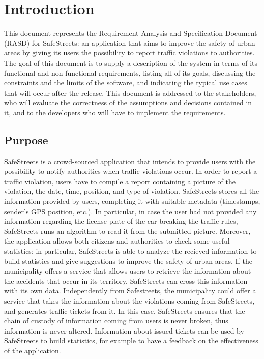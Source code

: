 \documentclass{report}
\begin{document}

\tableofcontents
\chapter{Introduction}
This document represents the Requirement Analysis and Specification Document (RASD) for SafeStreets: an application that aims to improve the safety of urban areas by giving its users the possibility to report traffic violations to authorities. The goal of this document is to supply a description of the system in terms of its functional and non-functional requirements, listing all of its goals, discussing the constraints and the limits of the software, and indicating the typical use cases that will occur after the release. This document is addressed to the stakeholders, who will evaluate the correctness of the assumptions and decisions contained in it, and to the developers who will have to implement the requirements.
\section{Purpose}
SafeStreets is a crowd-sourced application that intends to provide users with the possibility to notify authorities when traffic violations occur. In order to report a traffic violation, users have to compile a report containing a picture of the violation, the date, time, position, and type of violation. SafeStreets stores all the information provided by users, completing it with suitable metadata (timestamps, sender's GPS position, etc.). In particular, in case the user had not provided any information regarding the license plate of the car breaking the traffic rules, SafeStreets runs an algorithm to read it from the submitted picture. Moreover, the application allows both citizens and authorities to check some useful statistics: in particular, SafeStreets is able to analyze the recieved information to build statistics and give suggestions to improve the safety of urban areas. If the municipality offers a service that allows users to retrieve the information about the accidents that occur in its territory, SafeStreets can cross this information with its own data.
Independently from Safestreets, the municipality could offer a service that takes the information about the violations coming from SafeStreets, and generates traffic tickets from it. In this case, SafeStreets ensures that the chain of custody of information coming from users is never broken, thus information is never altered. Information about issued tickets can be used by SafeStreets to build statistics, for example to have a feedback on the effectiveness of the application.
\end{document}
